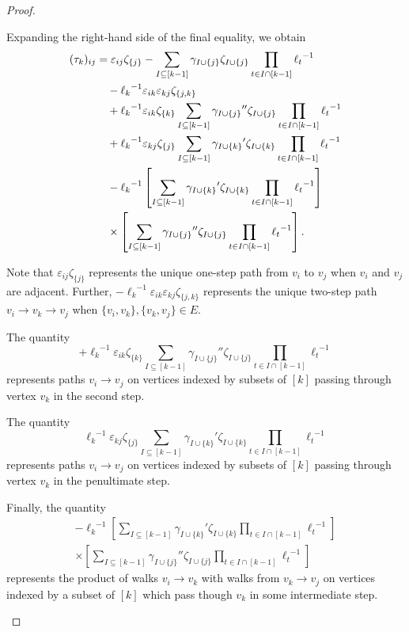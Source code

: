 \documentclass{article}
\theoremstyle{definition}
\numberwithin{equation}{section}
\begin{document}
\begin{proof}
\begin{description}
Expanding the right-hand side of the final equality, we obtain 
\begin{align*}
(\tau_k)_{ij}&=\varepsilon_{ij}\zeta_{\{j\}}-\sum_{I\subseteq [k-1]}\gamma_{I\cup\{j\}}\zeta_{I\cup\{j\}}\prod_{t\in I\cap[k-1]}{\ell_t}^{-1}\\
&\hskip10pt-{\ell_k}^{-1}\varepsilon_{ik}\varepsilon_{kj}\zeta_{\{j,k\}}\\
&\hskip10pt+{\ell_k}^{-1}\varepsilon_{ik}\zeta_{\{k\}}\sum_{I\subseteq [k-1]}{\gamma_{I\cup\{j\}}}''\zeta_{I\cup\{j\}}\prod_{t\in I\cap[k-1]}{\ell_t}^{-1}\\
&\hskip10pt+{\ell_k}^{-1}\varepsilon_{kj}\zeta_{\{j\}}\sum_{I\subseteq [k-1]}{\gamma_{I\cup\{k\}}}'\zeta_{I\cup\{k\}}\prod_{t\in I\cap[k-1]}{\ell_t}^{-1}\\
&\hskip10pt-{\ell_k}^{-1}\left[\sum_{I\subseteq [k-1]}{\gamma_{I\cup\{k\}}}'\zeta_{I\cup\{k\}}\prod_{t\in I\cap[k-1]}{\ell_t}^{-1}\right]\\
&\hskip10pt\times\left[\sum_{I\subseteq [k-1]}{\gamma_{I\cup\{j\}}}''\zeta_{I\cup\{j\}}\prod_{t\in I\cap[k-1]}{\ell_t}^{-1}\right].
\end{align*}

Note that $\varepsilon_{ij}\zeta_{\{j\}}$ represents the unique one-step path from $v_i$ to $v_j$ when $v_i$ and $v_j$ are adjacent.  Further, $-{\ell_k}^{-1}\varepsilon_{ik}\varepsilon_{kj}\zeta_{\{j,k\}}$ represents the unique two-step path $v_i\to v_k\to v_j$ when $\{v_i,v_k\}, \{v_k,v_j\}\in E$.  

The quantity \begin{equation*}
+{\ell_k}^{-1}\varepsilon_{ik}\zeta_{\{k\}}\sum_{I\subseteq [k-1]}{\gamma_{I\cup\{j\}}}''\zeta_{I\cup\{j\}}\prod_{t\in I\cap[k-1]}{\ell_t}^{-1}
\end{equation*}
represents paths $v_i\to v_j$ on vertices indexed by subsets of $[k]$ passing through vertex $v_k$ in the second step.

The quantity \begin{equation*}
{\ell_k}^{-1}\varepsilon_{kj}\zeta_{\{j\}}\sum_{I\subseteq [k-1]}{\gamma_{I\cup\{k\}}}'\zeta_{I\cup\{k\}}\prod_{t\in I\cap[k-1]}{\ell_t}^{-1}
\end{equation*}
represents paths $v_i\to v_j$ on vertices indexed by subsets of $[k]$ passing through vertex $v_k$ in the penultimate step.

Finally, the quantity 
\begin{align*}
-{\ell_k}^{-1}\left[\sum_{I\subseteq [k-1]}{\gamma_{I\cup\{k\}}}'\zeta_{I\cup\{k\}}\prod_{t\in I\cap[k-1]}{\ell_t}^{-1}\right]\\
 \times
\left[\sum_{I\subseteq [k-1]}{\gamma_{I\cup\{j\}}}''\zeta_{I\cup\{j\}}\prod_{t\in I\cap[k-1]}{\ell_t}^{-1}\right]
\end{align*}
represents the product of walks $v_i\to v_k$ with walks from $v_k\to v_j$ on vertices indexed by a subset of $[k]$ which pass though $v_k$ in some intermediate step.  




\end{description}
\end{proof}
\end{document}

